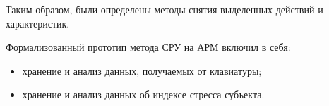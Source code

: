 Таким образом, были определены методы снятия выделенных действий и характеристик.

Формализованный прототип метода СРУ на АРМ включил в себя:
\begin{itemize}[leftmargin=1.6\parindent]
\item хранение и анализ данных, получаемых от клавиатуры;
\item хранение и анализ данных об индексе стресса субъекта. 
\end{itemize}

\pagebreak